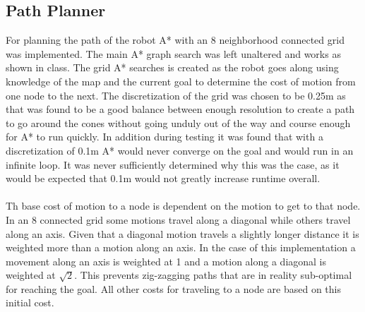 \documentclass[letterpaper,12pt]{article}
\begin{document}
\subsection{Path Planner}
For planning the path of the robot A* with an 8 neighborhood connected grid was implemented. The main A* graph search was left unaltered and works as shown in class. The grid A* searches is created as the robot goes along using knowledge of the map and the current goal to determine the cost of motion from one node to the next. The discretization of the grid was chosen to be 0.25m as that was found to be a good balance between enough resolution to create a path to go around the cones without going unduly out of the way and course enough for A* to run quickly. In addition during testing it was found that with a discretization of 0.1m A* would never converge on the goal and would run in an infinite loop. It was never sufficiently determined why this was the case, as it would be expected that 0.1m would not greatly increase runtime overall. 
\\\\
Th base cost of motion to a node is dependent on the motion to get to that node. In an 8 connected grid some motions travel along a diagonal while others travel along an axis. Given that a diagonal motion travels a slightly longer distance it is weighted more than a motion along an axis. In the case of this implementation a movement along an axis is weighted at 1 and a motion along a diagonal is weighted at $\sqrt{2}$. This prevents zig-zagging paths that are in reality sub-optimal for reaching the goal. All other costs for traveling to a node are based on this initial cost. 
\\\\
\end{document}
